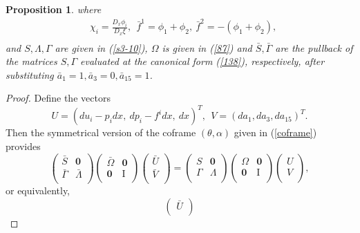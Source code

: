 \documentclass[10pt,a4paper]{amsart}
\newtheorem{proposition}{Proposition}
\begin{document}
\begin{proposition}
where
\begin{equation}
\begin{aligned}
&\chi_i=\frac{D_x\phi_i}{D_x\xi},~~\bar{f}^1=\phi_1+\phi_2,~\bar{f}^2=-(\phi_1+\phi_2),\\
\end{aligned}
\end{equation}
 and $S,\Lambda,\Gamma$ are given in (\ref{s3-10}), $\Omega$ is given in (\ref{87}) and $\bar{S}, \bar{\Gamma}$ are the pullback of the matrices $S, \Gamma$ evaluated at the canonical form (\ref{138}), respectively, after substituting $\bar{a}_1=1, \bar{a}_3=0, \bar{a}_{15}=1$.
\end{proposition}

\begin{proof} 
Define the vectors $$U=(du_i-p_idx, ~dp_i-f^idx, ~dx)^{T},~~V=(da_1,da_3,da_{15})^{T}.$$ Then the symmetrical version of the coframe $(\theta,\alpha)$ given in (\ref{coframe}) provides
\begin{equation}
\begin{pmatrix}
\bar{S}&\textbf{0}\\
\bar{\Gamma}&\bar{\Lambda}\\
\end{pmatrix}\begin{pmatrix}
\bar{\Omega}&\textbf{0}\\
\textbf{0}&\text{I}\\
\end{pmatrix}\begin{pmatrix}
\bar{U}\\
\bar{V}\\
\end{pmatrix}=
\begin{pmatrix}
S&\textbf{0}\\
\Gamma&\Lambda\\
\end{pmatrix}\begin{pmatrix}
\Omega&\textbf{0}\\
\textbf{0}&\text{I}\\
\end{pmatrix}\begin{pmatrix}
U\\
V\\
\end{pmatrix},
\end{equation}
or equivalently,
\begin{equation}\label{141}
\begin{pmatrix}
\bar{U}\\

\end{pmatrix}
\end{equation}
\end{proof}
\end{document}
